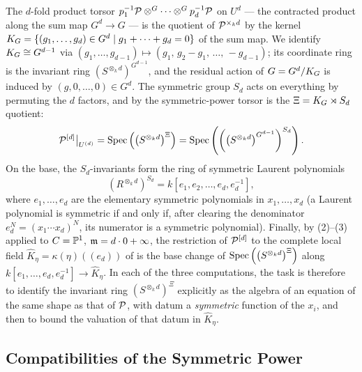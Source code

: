 The $d$-fold product torsor
$p_1^{-1}\mathcal{P} \otimes^G \cdots \otimes^G p_d^{-1}\mathcal{P}$ on $U^d$ --- the
contracted product along the sum map $G^d \to G$ --- is the quotient of
$\mathcal{P}^{\times_k d}$ by the kernel
$K_{G} = \{(g_1, \dots, g_d) \in G^d \mid g_1 + \dots + g_d = 0\}$ of the sum
map. We identify $K_{G} \cong G^{d-1}$ via
$(g_1, \dots, g_{d-1}) \mapsto (g_1,\, g_2 - g_1,\, \dots,\, -g_{d-1})$; its
coordinate ring is the invariant ring $\left(S^{\otimes_k d}\right)^{G^{d-1}}$,
and the residual action of $G = G^d / K_{G}$ is induced by
$(g, 0, \dots, 0) \in G^d$.
The symmetric group $S_d$ acts on everything by permuting the $d$ factors,
and by  the symmetric-power torsor is the
$\Xi = K_{G} \rtimes S_d$ quotient:
\[
    \mathcal{P}^{[d]}\big|_{U^{(d)}}
    = \operatorname{Spec} \left( \left( S^{\otimes_k d} \right)^{\Xi} \right)
    = \operatorname{Spec} \left( \left( \left( S^{\otimes_k d} \right)^{G^{d-1}} \right)^{S_d} \right).
\]
On the base, the $S_d$-invariants form the ring of symmetric Laurent
polynomials
\[
    \left(R^{\otimes_k d}\right)^{S_d} = k[e_1, e_2, \dots, e_d, e_d^{-1}],
\]
where $e_1, \dots, e_d$ are the elementary symmetric polynomials in
$x_1, \dots, x_d$ (a Laurent polynomial is symmetric if and only if, after
clearing the denominator $e_d^N = (x_1 \cdots x_d)^N$, its numerator is a
symmetric polynomial). Finally, by
(2)--(3) applied to $C = \mathbb{P}^1$,
$\mathfrak{m} = d \cdot 0 + \infty$, the restriction of $\mathcal{P}^{[d]}$ to the complete
local field $\widehat{K}_\eta = \kappa(\eta)((e_d))$ of
 is the base change of
$\operatorname{Spec}\left( \left( S^{\otimes_k d} \right)^{\Xi} \right)$ along
$k[e_1, \dots, e_d, e_d^{-1}] \to \widehat{K}_\eta$. In each of the three
computations, the task is therefore to identify the invariant ring
$\left( S^{\otimes_k d} \right)^{\Xi}$ explicitly as the algebra of an
equation of the same shape as that of $\mathcal{P}$, with datum a \emph{symmetric}
function of the $x_i$, and then to bound the valuation of that datum in
$\widehat{K}_\eta$.

\subsection*{Compatibilities of the Symmetric Power}


